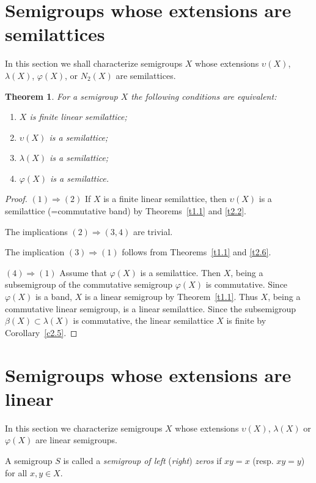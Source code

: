 \documentclass{amsart}
\newtheorem{theorem}[lem]{Theorem}
\theoremstyle{definition}
\begin{document}
\section{Semigroups whose extensions are semilattices}

In this section we shall characterize semigroups $X$ whose extensions ${\upsilon}(X)$, $\lambda(X)$, $\varphi(X)$, or $N_2(X)$ are semilattices.

\begin{theorem}\label{t3.1} For a semigroup $X$ the following conditions are equivalent:
\begin{enumerate}
\item $X$ is finite linear semilattice;
\item $\upsilon(X)$ is a semilattice;
\item $\lambda(X)$ is a semilattice;
\item $\varphi(X)$ is a semilattice.
\end{enumerate}
\end{theorem}

\begin{proof} $(1){\Rightarrow}(2)$ If $X$ is a finite linear semilattice, then $\upsilon(X)$ is a semilattice (=commutative band) by Theorems~\ref{t1.1} and \ref{t2.2}.
\smallskip

The implications $(2){\Rightarrow}(3,4)$ are trivial.
\smallskip

The implication $(3){\Rightarrow}(1)$ follows from Theorems~\ref{t1.1} and \ref{t2.6}.
\smallskip

$(4){\Rightarrow}(1)$ Assume that $\varphi(X)$ is a semilattice. Then $X$, being a subsemigroup of the commutative semigroup $\varphi(X)$ is commutative. Since $\varphi(X)$ is a band, $X$ is a linear semigroup by Theorem~\ref{t1.1}. Thus $X$, being a commutative linear semigroup, is a linear semilattice.
Since the subsemigroup $\beta(X)\subset\lambda(X)$ is commutative, the linear semilattice $X$ is finite by Corollary~\ref{c2.5}.
\end{proof}

\section{Semigroups whose extensions are linear}

In this section we characterize semigroups $X$ whose extensions ${\upsilon}(X)$, $\lambda(X)$ or $\varphi(X)$ are linear semigroups.

A semigroup $S$ is called a {\em semigroup of left} ({\em right}) {\em zeros} if $xy=x$ (resp. $xy=y$) for all $x,y\in X$.
\end{document}
